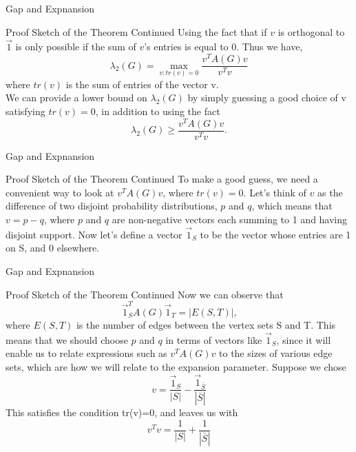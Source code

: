 \documentclass[10pt]{beamer}
\begin{document}
\begin{frame}{Gap and Expnansion}
    \begin{block}{Proof Sketch of the Theorem Continued}
        Using the fact that if $v$ is orthogonal to $\vec{1}$ is only possible if the sum of $v$'s entries is equal to 0.
        \pause{}
        Thus we have,
        $$\lambda_2(G) = \max\limits_{v:tr(v)=0} \frac{v^TA(G)v}{v^Tv}$$
        where $tr(v)$ is the sum of entries of the vector v.\\
        \pause{}
        We can provide a lower bound on $\lambda_2(G)$ by simply guessing a good choice of v satisfying $tr(v)=0$, in addition to using the fact
        $$\lambda_2(G) \geq \frac{v^TA(G)v}{v^Tv}.$$
    \end{block}
\end{frame}

\begin{frame}{Gap and Expnansion}
    \begin{block}{Proof Sketch of the Theorem Continued}
        To make a good guess, we need a convenient way to look at $v^TA(G)v$, where $tr(v)=0$.
        \pause{}
        Let's think of $v$ as the difference of two disjoint probability distributions, $p$ and $q$, which means that $v=p-q$, where $p$ and $q$ are non-negative vectors each summing to 1 and having disjoint support.
        \pause{}
        Now let's define a vector $\vec{1}_S$ to be the vector whose entries are 1 on S, and 0 elsewhere.
    \end{block}
\end{frame}

\begin{frame}{Gap and Expnansion}
    \begin{block}{Proof Sketch of the Theorem Continued}
        Now we can observe that 
        \[\vec{1}_S^TA(G)\vec{1}_T = |E(S,T)|\text{,}\]
        where $E(S,T)$ is the number of edges between the vertex sets S and T.
        \pause{}
        This means that we should choose $p$ and $q$ in terms of vectors like $\vec{1}_S$, since it will enable us to relate expressions such as $v^TA(G)v$ to the sizes of various edge sets, which are how we will relate to the expansion parameter.
        \pause{}
        Suppose we chose \[v=\frac{\vec{1}_S}{|S|}-\frac{\vec{1}_{\bar{S}}}{|\bar{S}|}\]
        \pause{}
        This satisfies the condition tr(v)=0, and leaves us with
        \[v^Tv=\frac{1}{|S|}+\frac{1}{|\bar{S}|}\]
    \end{block}
\end{frame}
\end{document}
